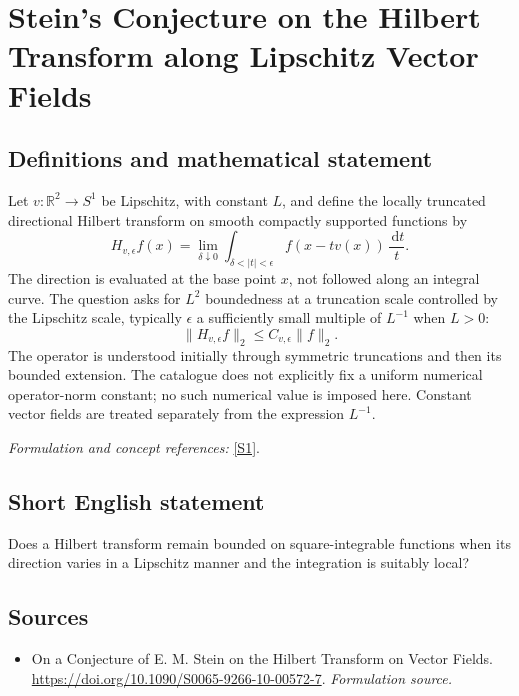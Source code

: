 \documentclass[11pt]{article}
\begin{document}
\section*{\texorpdfstring{Stein's Conjecture on the Hilbert Transform along Lipschitz Vector Fields}{Stein's Conjecture on the Hilbert Transform along Lipschitz Vector Fields}}\label{30006932}
\subsection{Definitions and mathematical statement}
Let $v:{\mathbb{R}}^2\to S^1$ be Lipschitz, with constant $L$, and define the locally truncated directional Hilbert transform on smooth compactly supported functions by
\[
 H_{v,\epsilon}f(x)=\lim_{\delta\downarrow0}
 \int_{\delta<|t|<\epsilon}f(x-tv(x))\,\frac{{\,\mathrm{d}} t}{t}.
\]
The direction is evaluated at the base point $x$, not followed along an integral curve. The question asks for $L^2$ boundedness at a truncation scale controlled by the Lipschitz scale, typically $\epsilon$ a sufficiently small multiple of $L^{-1}$ when $L>0$:
\[
 \|H_{v,\epsilon}f\|_2\le C_{v,\epsilon}\|f\|_2.
\]
The operator is understood initially through symmetric truncations and then its bounded extension. The catalogue does not explicitly fix a uniform numerical operator-norm constant; no such numerical value is imposed here. Constant vector fields are treated separately from the expression $L^{-1}$.
\par\smallskip\textit{Formulation and concept references:} \href{https://doi.org/10.1090/S0065-9266-10-00572-7}{[S1]}.

\subsection{Short English statement}
Does a Hilbert transform remain bounded on square-integrable functions when its direction varies in a Lipschitz manner and the integration is suitably local?
\subsection{Sources}
\begin{itemize}
\item[S1]On a Conjecture of E. M. Stein on the Hilbert Transform on Vector Fields.
\url{https://doi.org/10.1090/S0065-9266-10-00572-7}.
\textit{Formulation source.}
\end{itemize}
\end{document}
